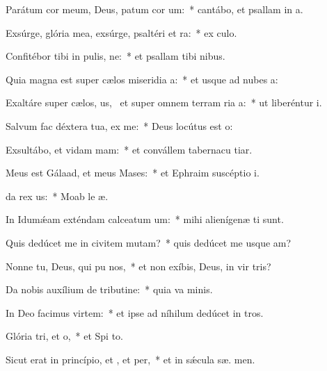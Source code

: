 \item Parátum cor meum, Deus, patum cor um:~* cantábo, et psallam in  a.
\item Exsúrge, glória mea, exsúrge, psaltéri et ra:~* ex culo.
\item Confitébor tibi in pulis, ne:~* et psallam tibi  nibus.
\item Quia magna est super cælos miseridia a:~* et usque ad nubes  a:
\item Exaltáre super cælos, us,~\pscross{} et super omnem terram ria a:~* ut liberéntur  i.
\item Salvum fac déxtera tua,  ex me:~* Deus locútus est   o:
\item Exsultábo, et vidam mam:~* et convállem tabernacu tiar.
\item Meus est Gálaad, et meus  Mases:~* et Ephraim suscéptio  i.
\item {}da rex us:~* Moab le  æ.
\item In Idumǽam exténdam calceatum um:~* mihi alienígenæ  ti sunt.
\item Quis dedúcet me in civitem mutam?~* quis dedúcet me usque  am?
\item Nonne tu, Deus, qui pu nos,~* et non exíbis, Deus, in vir tris?
\item Da nobis auxílium de tributine:~* quia va  minis.
\item In Deo facimus virtem:~* et ipse ad níhilum dedúcet in tros.
\item Glória tri, et o,~* et Spi to.
\item Sicut erat in princípio, et , et per,~* et in sǽcula sæ. men.
